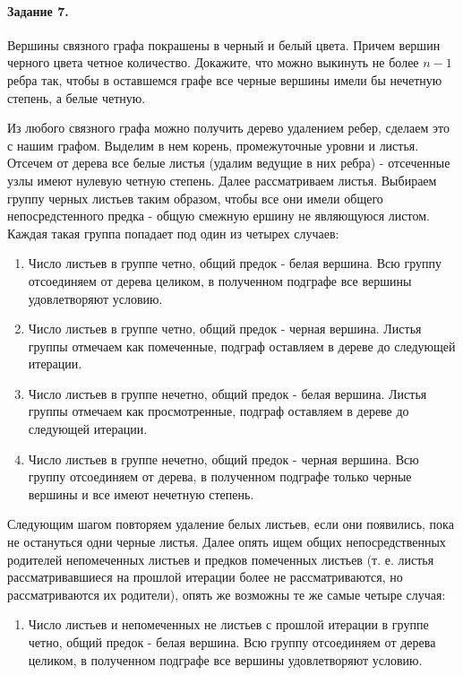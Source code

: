 \documentclass[a4paper,12pt]{article}
\begin{document}
\paragraph{Задание 7.} Вершины связного графа покрашены в черный и белый цвета. Причем вершин черного цвета четное количество. Докажите, что можно выкинуть не более $n-1$ ребра так, чтобы в оставшемся графе все черные вершины имели бы нечетную степень, а белые четную.
\begin{Solution}
Из любого связного графа можно получить дерево удалением ребер, сделаем это с нашим графом. Выделим в нем корень, промежуточные уровни и листья. Отсечем от дерева все белые листья (удалим ведущие в них ребра) - отсеченные узлы имеют нулевую четную степень. Далее рассматриваем листья. Выбираем группу черных листьев таким образом, чтобы все они имели общего непосредстенного предка - общую смежную ершину не являющуюся листом. Каждая такая группа попадает под один из четырех случаев:
\begin{enumerate}
\item Число листьев в группе четно, общий предок - белая вершина. Всю группу отсоединяем от дерева целиком, в полученном подграфе все вершины удовлетворяют условию.

\item Число листьев в группе четно, общий предок - черная вершина. Листья группы отмечаем как помеченные, подграф оставляем в дереве до следующей итерации.

\item Число листьев в группе нечетно, общий предок - белая вершина. Листья группы отмечаем как просмотренные, подграф оставляем в дереве до следующей итерации.

\item Число листьев в группе нечетно, общий предок - черная вершина. Всю группу отсоединяем от дерева, в полученном подграфе только черные вершины и все имеют нечетную степень.
\end{enumerate}
Следующим шагом повторяем удаление белых листьев, если они появились, пока не остануться одни черные листья. Далее опять ищем общих непосредственных родителей непомеченных листьев и предков помеченных листьев (т. е. листья рассматривавшиеся на прошлой итерации более не рассматриваются, но рассматриваются их родители), опять же возможны те же самые четыре случая:
\begin{enumerate}
\item Число листьев и непомеченных не листьев с прошлой итерации в группе четно, общий предок - белая вершина. Всю группу отсоединяем от дерева целиком, в полученном подграфе все вершины удовлетворяют условию.


\end{enumerate}
\end{Solution}
\end{document}
